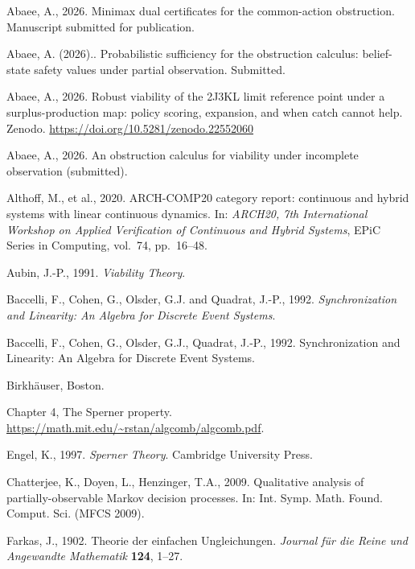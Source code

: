 \documentclass[10pt,twocolumn]{article}
\theoremstyle{plain}
\theoremstyle{definition}
\theoremstyle{remark}
\begin{document}
Abaee, A., 2026. Minimax dual certificates for the common-action
obstruction. Manuscript submitted for publication.

Abaee, A. (2026).. Probabilistic sufficiency for the obstruction calculus: belief-state safety values under partial observation. Submitted.

Abaee, A., 2026. Robust viability of the 2J3KL limit reference point
under a surplus-production map: policy scoring, expansion, and when
catch cannot help. Zenodo.
\url{https://doi.org/10.5281/zenodo.22552060}

Abaee, A., 2026. An obstruction calculus for viability under
incomplete observation (submitted).

Althoff, M., et al., 2020. ARCH-COMP20 category report: continuous and hybrid systems with
linear continuous dynamics. In: \emph{ARCH20, 7th International Workshop on Applied
Verification of Continuous and Hybrid Systems}, EPiC Series in Computing, vol.~74, pp.~16--48.

Aubin, J.-P., 1991. \emph{Viability Theory}.

Baccelli, F., Cohen, G., Olsder, G.J. and Quadrat, J.-P., 1992. \emph{Synchronization and
Linearity: An Algebra for Discrete Event Systems}.

Baccelli, F., Cohen, G., Olsder, G.J., Quadrat, J.-P., 1992.
Synchronization and Linearity: An Algebra for Discrete Event Systems.

Birkh\"auser, Boston.

Chapter 4, The Sperner
property. \url{https://math.mit.edu/~rstan/algcomb/algcomb.pdf}.

Engel, K., 1997. \emph{Sperner Theory}. Cambridge University Press.

Chatterjee, K., Doyen, L., Henzinger, T.A., 2009. Qualitative analysis of
partially-observable Markov decision processes. In: Int. Symp. Math. Found. Comput. Sci.
(MFCS 2009).

Farkas, J., 1902. Theorie der einfachen Ungleichungen. \emph{Journal f\"ur die Reine und
Angewandte Mathematik} \textbf{124}, 1--27.
\end{document}
